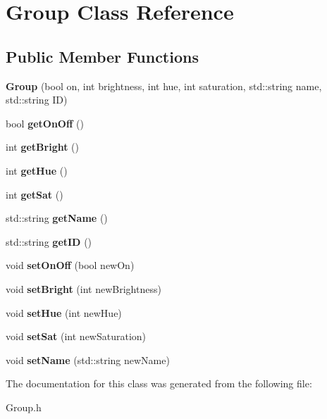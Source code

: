 \hypertarget{classGroup}{}\section{Group Class Reference}
\label{classGroup}
\subsection*{Public Member Functions}
\begin{DoxyCompactItemize}
\item 
\mbox{\label{classGroup_a2a82b0b9bbd698a8e631d0a20a49d800}} 
{\bfseries Group} (bool on, int brightness, int hue, int saturation, std\+::string name, std\+::string ID)
\item 
\mbox{\label{classGroup_ab6fbdfbb2e98ced7e8765291a46f086a}} 
bool {\bfseries get\+On\+Off} ()
\item 
\mbox{\label{classGroup_a31cbe4e4bfc86305e939b4978045171c}} 
int {\bfseries get\+Bright} ()
\item 
\mbox{\label{classGroup_aa987a57616beb2d9b84bfb61284cb9b3}} 
int {\bfseries get\+Hue} ()
\item 
\mbox{\label{classGroup_ad81eb4c13f966c37be372796acba0e5b}} 
int {\bfseries get\+Sat} ()
\item 
\mbox{\label{classGroup_a0743628e788acf04697d9c3765804ecd}} 
std\+::string {\bfseries get\+Name} ()
\item 
\mbox{\label{classGroup_aa9851780971f3b67d2b368510fc60ffa}} 
std\+::string {\bfseries get\+ID} ()
\item 
\mbox{\label{classGroup_ad63a3accefa5e37a130b6d8982386809}} 
void {\bfseries set\+On\+Off} (bool new\+On)
\item 
\mbox{\label{classGroup_aab9235a756112da33275921cb46904f9}} 
void {\bfseries set\+Bright} (int new\+Brightness)
\item 
\mbox{\label{classGroup_ad7261baaf028b289c206b2a8e66a9e39}} 
void {\bfseries set\+Hue} (int new\+Hue)
\item 
\mbox{\label{classGroup_a60def9d327640e26fae7d77a4ec19d51}} 
void {\bfseries set\+Sat} (int new\+Saturation)
\item 
\mbox{\label{classGroup_a2720f4db738984cdd2519eb4150928b9}} 
void {\bfseries set\+Name} (std\+::string new\+Name)
\end{DoxyCompactItemize}


The documentation for this class was generated from the following file\+:\begin{DoxyCompactItemize}
\item 
Group.\+h\end{DoxyCompactItemize}
